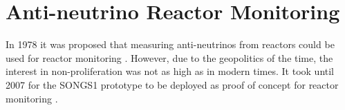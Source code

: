 \section{Anti-neutrino Reactor Monitoring}
In 1978 it was proposed that measuring anti-neutrinos from reactors could be used for reactor monitoring \cite{Borovoi_1978}. However, due to the geopolitics of the time, the interest in non-proliferation was not as high as in modern times. It took until 2007 for the SONGS1 prototype to be deployed as proof of concept for reactor monitoring \cite{Bowden_2007}.
